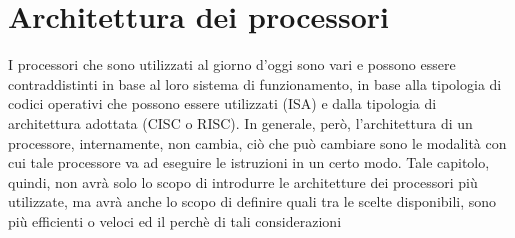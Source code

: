 \chapter{Architettura dei processori}
I processori che sono utilizzati al giorno d'oggi sono vari e possono essere contraddistinti in base al loro sistema di funzionamento, in base alla tipologia di codici operativi che possono essere utilizzati (ISA) e dalla tipologia di architettura adottata (CISC o RISC). 
In generale, però, l'architettura di un processore, internamente, non cambia, ciò che può cambiare sono le modalità con cui tale processore va ad eseguire le istruzioni in un certo modo. Tale capitolo, quindi, non avrà solo lo scopo di introdurre le architetture dei processori più utilizzate, ma avrà anche lo scopo di definire quali tra le scelte disponibili, sono più efficienti o veloci ed il perchè di tali considerazioni




